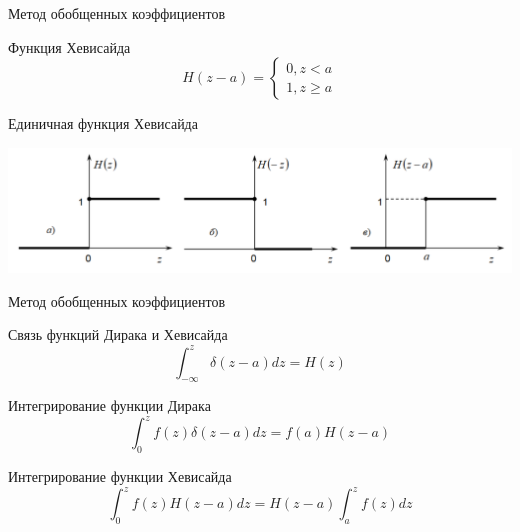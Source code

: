 \documentclass[ignoreonframetext,unicode]{beamer}
\begin{document}
	\begin{frame}{Метод обобщенных коэффициентов}
		\begin{block}{Функция Хевисайда}	
			\[
			H(z - a) = 
			\begin{cases}
				0, z < a \\
				1, z \geqslant a	
			\end{cases}
			\]
		\end{block}
	Единичная функция Хевисайда

	\includegraphics[width=1\textwidth]{heavi}
		
	\end{frame}


\begin{frame}{Метод обобщенных коэффициентов}
	
	\begin{block}{Связь функций Дирака и Хевисайда}	
		\[
		\int_{-\infty}^z \delta (z - a) dz = 
		H(z)
		\]
	\end{block}

	\begin{block}{Интегрирование функции Дирака}	
	\[
	\int_0^z f(z) \delta(z - a) d z = f(a)H(z - a)
	\]
	\end{block}

	\begin{block}{Интегрирование функции Хевисайда}	
	\[
	\int_0^z f(z) H(z - a) d z = H(z - a)\int_a^z f(z) d z
	\]
	\end{block}

\end{frame}
\end{document}
